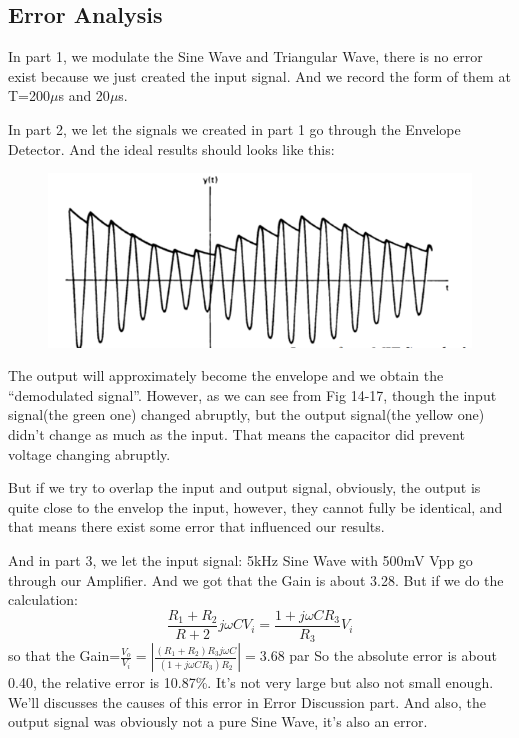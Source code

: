 \documentclass[12pt]{article}
\begin{document}
\subsection{Error Analysis}
In part 1, we modulate the Sine Wave and Triangular Wave, there is no error exist because we just created the input signal. And we record the form of them at T=200$\mu$s and 20$\mu$s.
\par In part 2, we let the signals we created in part 1 go through the Envelope Detector. 
And the ideal results should looks like this:
\begin{figure}[H]
\centering
\includegraphics[scale=0.5]{P21.jpg}
\end{figure}
\par The output will approximately become the envelope and we obtain the “demodulated signal”. However, as we can see from Fig 14-17, though the input signal(the green one) changed abruptly, but the output signal(the yellow one) didn’t change as much as the input. That means the capacitor did prevent voltage changing abruptly.
\par But if we try to overlap the input and output signal, obviously, the output is quite close to the envelop the input, however, they cannot fully be identical, and that means there exist some error that influenced our results.
\par And in part 3, we let the input signal: 5kHz Sine Wave with 500mV Vpp go through our Amplifier. And we got that the Gain is about 3.28. But if we do the calculation:
$$\frac{R_1+R_2}{R+2}j\omega CV_i=\frac{1+j\omega CR_3}{R_3}V_i$$
so that the Gain=$\frac{V_o}{V_i}=|\frac{(R_1+R_2)R_3j\omega C}{(1+j\omega CR_3)R_2}|=3.68$
par So the absolute error is about 0.40, the relative error is 10.87\%. It’s not very large but also not small enough. We’ll discusses the causes of this error in Error Discussion part.
And also, the output signal was obviously not a pure Sine Wave, it’s also an error.
\end{document}
